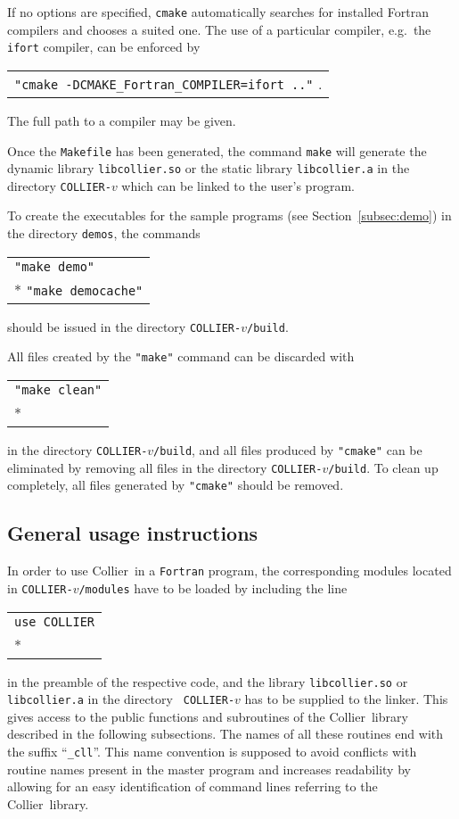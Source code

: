 \documentclass[preprint,sort&compress,12pt]{elsarticle}
\makeatletter
\def\bce{\begin{center}}
\def\ece{\end{center}}
\def\refse#1{\mbox{Section~\ref{#1}}}
\def\eg{e.g.\ }
\newcommand{\collier}{{\sc Collier}}
\newlength{\parwidth}\newlength{\colonewidth}%
\newcommand{\cpcsub}[1]
{%
\setlength{\parwidth}{\textwidth}\addtolength{\parwidth}{-2.1em}%
\bce
\begin{tabular}[t]{@{}p{\parwidth}@{}}
#1
\end{tabular}
\ece
}%
\makeatother
\begin{document}
If no options are specified, {\tt cmake} automatically searches for installed
Fortran compilers and chooses a suited one.
The use of a particular compiler, \eg the {\tt ifort} compiler, can be
enforced by
\cpcsub{%
  {\tt "cmake -DCMAKE\_Fortran\_COMPILER=ifort .."} \;.
} 
The full path to a compiler may be given.

Once the {\tt Makefile} has been generated, the command {\tt make}
will generate the dynamic library {\tt libcollier.so} or the static
library {\tt libcollier.a} in the directory {\tt COLLIER-$v$} which can
be linked to the user's program.

To create the executables for the sample programs (see
\refse{subsec:demo}) in the directory {\tt demos}, the commands
\cpcsub{%
{\tt "make demo"}\\*
{\tt "make democache"}
}
should be issued in the directory {\tt COLLIER-$v$/build}.

All files created by the {\tt "make"} command can be discarded with
\cpcsub{%
  {\tt "make clean"}\\*
  } in the directory {\tt COLLIER-$v$/build}, and all files produced by
{\tt "cmake"} can be eliminated by removing all files in the directory
{\tt COLLIER-$v$/build}.
To clean up completely, all files generated by {\tt "cmake"} should be removed.

\subsection{General usage instructions}
\label{subsec:GenUse}
In order to use \collier\ in a {\tt Fortran} program, the
corresponding modules located in {\tt COLLIER-$v$/modules} have to be
loaded by including the line
\cpcsub{%
  {\tt use COLLIER}\\*
  } 
in the preamble of the respective code, 
and the library
{\tt libcollier.so} or {\tt libcollier.a} in the directory {\tt
  COLLIER-$v$} has to be supplied to the linker.
 This gives access to the
public functions and subroutines of the \collier\ library described in
the following subsections. The names of all these routines end with
the suffix ``{\tt \_cll}''. This name convention is supposed to avoid
conflicts with routine names present in the master program and
increases readability by allowing for an easy identification of
command lines referring to the \collier\ library.
\end{document}

